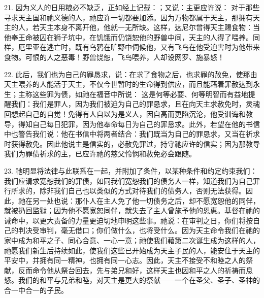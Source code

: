 21. 因为义人的日用粮必不缺乏，正如经上记载：\newline{}；又说：主更应许说：\newline{} 对于那些寻求天主国和祂义德的人，祂应许一切都要加添。因为万物都属于天主，那拥有天主的人，若天主本身不离开他，他就一无所缺。这样，达尼尔曾得天主赐食物：当他奉王命被囚在狮子坑中，在饥饿而仍饶恕他的野兽中间，天主的人得了喂养。同样，厄里亚在逃亡时，既有乌鸦在旷野中伺候他，又有飞鸟在他受迫害时为他带来食物。可恨的人之恶毒！野兽饶恕，飞鸟喂养，人却设网罗、施暴怒！\par

22. 此后，我们也为自己的罪恳求，说：在求了食物之后，也求罪的赦免，使那由天主喂养的人能活于天主，不仅今世暂时的生命得到供应，而且能藉着罪赦达到永生；主称这些罪为债，如祂在福音中所说：\newline{} 这是何等必要、何等明智而有益地提醒我们：我们是罪人，因为我们被迫为自己的罪恳求，且在向天主求赦免时，灵魂回想起自己的自觉！免得有人自以为是义人，因自高而更陷沉沦，他受训诲和教导，得知自己每日犯罪，因为他奉命每日为自己的罪恳求。此外，若望在他的书信中也警告我们说：他在书信中将两者结合：我们既当为自己的罪恳求，又当在祈求时获得赦免。因此他说主是信实的，必赦免罪过，持守祂应许的信实；因为那教导我们为罪债祈求的主，已应许祂的慈父怜悯和赦免必会跟随。\par

23. 祂明显将法律与此联系在一起，并附加了条件，以某种条件和约定约束我们：我们应请求宽恕我们的罪债，如同我们宽恕我们的债务人一样，知道我们为自己罪行所求的，除非我们自己也以类似的方式对待我们的债务人，否则无法获得。因此，祂在另一处也说：那仆人在主人免了他一切债务之后，却不愿宽恕他的同伴，就被扔回监狱；因为他不愿宽恕同伴，就失去了主人曾施予他的恩惠。基督在祂的诫命中，以更大责备的力量更迫切地申明这些事。祂说：在审判之日，你们将按自己的判决受审判，毫无借口；你们做什么，也将受什么。因为天主命令我们在祂的家中成为和平之子、同心合意、一心一意；祂使我们藉第二次诞生成为这样的人，祂愿我们新生后持续如此，使我们这些已开始成为天主子民的人，能安住于天主的平安中，并拥有同一精神，也拥有同一心志。因此，天主不接受不和睦之人的祭献，反而命令他从祭台回去，先与弟兄和好，这样天主也因和平之人的祈祷而息怒。我们的和平与兄弟和睦，对天主是更大的祭献——一个在圣父、圣子、圣神的合一中合一的子民。\par

